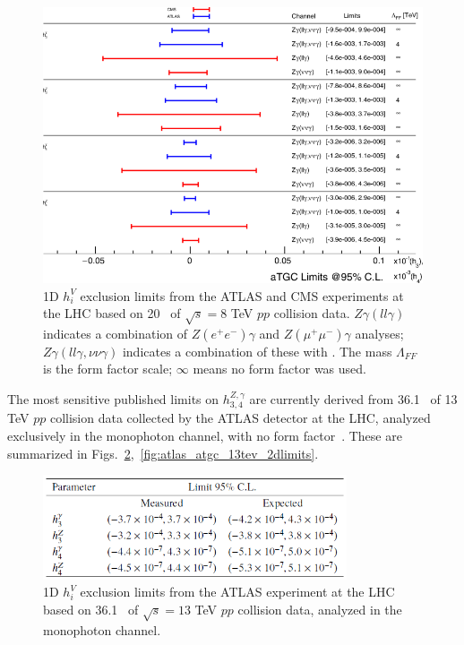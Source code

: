 \documentclass[oneside, letterpaper, 12pt, oldfontcommands]{memoir}
\begin{document}
\begin{figure}[hbtp]
  \begin{center}
    \includegraphics[width=\textwidth]{Figures/lhc_8tev_atgc_1dlimits.png}
    \caption{
      1D $h_{i}^{V}$ exclusion limits from the ATLAS and CMS experiments at the LHC based on 20 \fbinv\ of $\sqrt{s} = 8$ TeV
      $pp$ collision data. $Z\gamma(ll\gamma)$ indicates a combination of $Z(e^\mathrm{+}e^\mathrm{-})\gamma$ and $Z(\mu^\mathrm{+}\mu^\mathrm{-})\gamma$
      analyses; $Z\gamma(ll\gamma,\nu\nu\gamma)$ indicates a combination of these with \zinvg. The mass $\Lambda_{FF}$
      is the form factor scale; $\infty$ means no form factor was used.~\cite{ref:RevModPhys.89.035008}
    }
    \label{fig:lhc_8tev_atgc_1dlimits}
  \end{center}
\end{figure}

The most sensitive published limits on $h_{3,4}^{Z,\gamma}$ are currently derived from 36.1 \fbinv\ of 13 TeV $pp$ collision
data collected by the ATLAS detector at the LHC, analyzed exclusively in the monophoton channel, with no form factor~\cite{ref:ATLAS-CONF-2018-035}.
These are summarized in Figs.~\ref{fig:atlas_atgc_13tev_1dlimits},~\ref{fig:atlas_atgc_13tev_2dlimits}.

\begin{figure}[hbtp]
  \begin{center}
    \includegraphics[width=0.8\textwidth]{Figures/atlas_atgc_13tev_1dlimits.png}
    \caption{
      1D $h_{i}^{V}$ exclusion limits from the ATLAS experiment at the LHC based on 36.1 \fbinv\ of $\sqrt{s} = 13$ TeV
      $pp$ collision data, analyzed in the monophoton channel.~\cite{ref:ATLAS-CONF-2018-035}
    }
    \label{fig:atlas_atgc_13tev_1dlimits}
  \end{center}
\end{figure}
\end{document}
